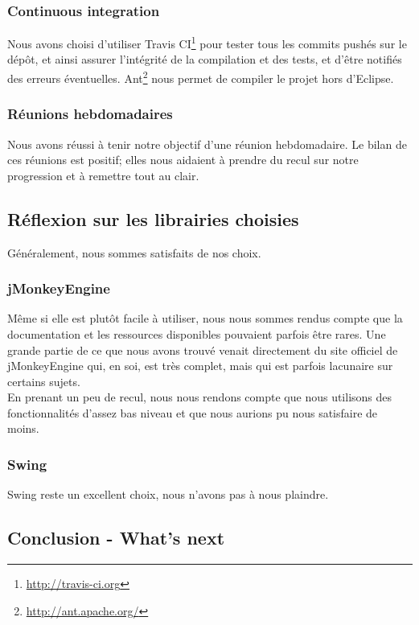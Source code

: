 	\subsubsection{Continuous integration}
	Nous avons choisi d'utiliser Travis CI\footnote{\url{http://travis-ci.org}}
	pour tester tous les commits pushés sur le dépôt, et ainsi assurer
	l'intégrité de la compilation et des tests, et d'être notifiés des erreurs
	éventuelles. Ant\footnote{\url{http://ant.apache.org/}} nous permet de
	compiler le projet hors d'Eclipse.

	\subsubsection{Réunions hebdomadaires}
	Nous avons réussi à tenir notre objectif d'une réunion hebdomadaire. Le 
	bilan de ces réunions est positif; elles nous aidaient à prendre du 
	recul sur notre progression et à remettre tout au clair. 

\subsection{Réflexion sur les librairies choisies}

	Généralement, nous sommes satisfaits de nos choix.

	\subsubsection{jMonkeyEngine}
	Même si elle est plutôt facile à utiliser, nous nous sommes rendus compte
	que la documentation et les ressources disponibles pouvaient parfois être
	rares. Une grande partie de ce que nous avons trouvé venait directement 
	du site officiel de jMonkeyEngine qui, en soi, est très complet, mais qui
	est parfois lacunaire sur certains sujets.\\

	En prenant un peu de recul, nous nous rendons compte que nous utilisons
	des fonctionnalités d'assez bas niveau et que nous aurions pu nous 
	satisfaire de moins.

	\subsubsection{Swing}
	Swing reste un excellent choix, nous n'avons pas à nous plaindre.

\subsection{Conclusion - What's next}


